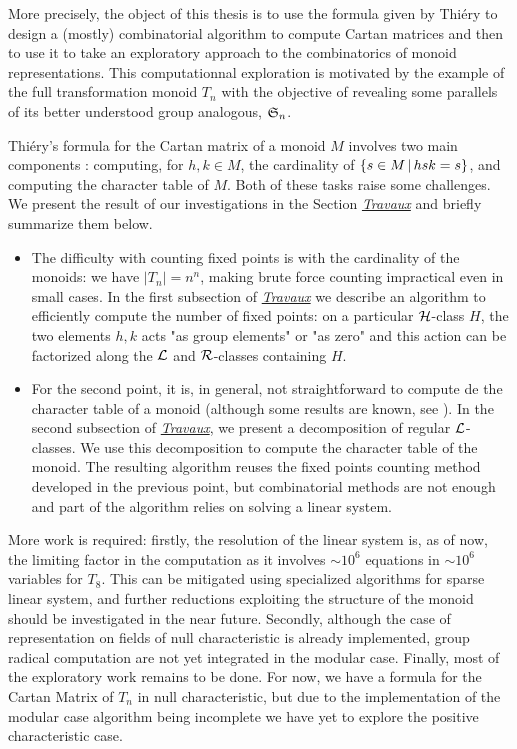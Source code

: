 \documentclass{article}
\begin{document}
	More precisely, the object of this thesis is to use the formula given by Thiéry to design a (mostly) combinatorial algorithm to compute Cartan matrices and then to use it to take an exploratory approach to the combinatorics of  monoid representations. This computationnal exploration is motivated by the example of the full transformation monoid $T_n$ with the objective of revealing some parallels of its better understood group analogous, $\mathfrak{S}_n$.
	
	Thiéry's formula for the Cartan matrix of a monoid $M$ involves two main components : computing, for $h, k \in M$, the cardinality of $\{s \in M \,\vert\, hsk = s\}$, and computing the character table of $M$. Both of these tasks raise some challenges. We present the result of our investigations in the Section \href{sec:travaux}{\emph{Travaux}} and briefly summarize them below.
	\begin{itemize}
		\item The difficulty with counting fixed points is with the cardinality of the monoids: we have $|T_n| = n^n$, making brute force counting impractical even in small cases. In the first subsection of \href{sec:travaux}{\emph{Travaux}} we describe an algorithm to efficiently compute  the number of fixed points: on a particular $\mathcal{H}$-class $H$, the two elements $h, k$ acts "as group elements" or "as zero" and this action can be factorized along the $\mathcal{L}$ and $\mathcal{R}$-classes containing $H$.
		\item For the second point, it is, in general, not straightforward to compute de the character table of a monoid (although some results are known, see \cite[Section 9.4]{steinberg2016representation}). In the second subsection of \href{sec:travaux}{\emph{Travaux}}, we present a decomposition of regular $\mathcal{L}$-classes. We use this decomposition to compute the character table of the monoid. The resulting algorithm reuses the fixed points counting method developed in the previous point, but combinatorial methods are not enough and part of the algorithm relies on solving a linear system.
	\end{itemize}

	More work is required: firstly, the resolution of the linear system is, as of now, the limiting factor in the computation as it involves $\sim 10^6$ equations in $\sim10^6$ variables for $T_8$. This can be mitigated using specialized algorithms for sparse linear system, and further reductions exploiting the structure of the monoid should be investigated in the near future.
	Secondly, although the case of representation on fields of null characteristic is already implemented, group radical computation are not yet integrated in the modular case.
	Finally, most of the exploratory work remains to be done. For now, we have a formula for the Cartan Matrix of $T_n$ in null characteristic, but due to the implementation of the modular case algorithm being incomplete we have yet to explore the positive characteristic case.
	
\end{document}
